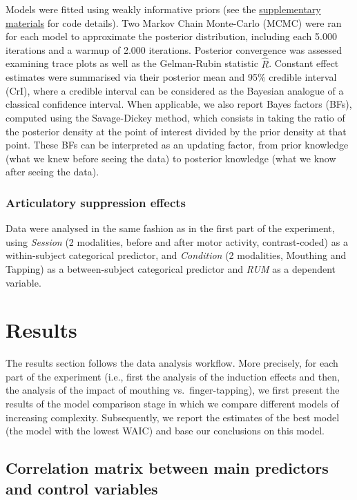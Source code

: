 \documentclass[a4paper,12pt,twoside,openright,oldfontcommands,final]{memoir}
\begin{document}
Models were fitted using weakly informative priors (see the \protect\hyperlink{suppCh6}{supplementary materials} for code details). Two Markov Chain Monte-Carlo (MCMC) were ran for each model to approximate the posterior distribution, including each 5.000 iterations and a warmup of 2.000 iterations. Posterior convergence was assessed examining trace plots as well as the Gelman-Rubin statistic \(\hat{R}\). Constant effect estimates were summarised via their posterior mean and 95\% credible interval (CrI), where a credible interval can be considered as the Bayesian analogue of a classical confidence interval. When applicable, we also report Bayes factors (BFs), computed using the Savage-Dickey method, which consists in taking the ratio of the posterior density at the point of interest divided by the prior density at that point. These BFs can be interpreted as an updating factor, from prior knowledge (what we knew before seeing the data) to posterior knowledge (what we know after seeing the data).

\hypertarget{articulatory-suppression-effects}{%
\subsubsection{Articulatory suppression effects}\label{articulatory-suppression-effects}}

Data were analysed in the same fashion as in the first part of the experiment, using \emph{Session} (2 modalities, before and after motor activity, contrast-coded) as a within-subject categorical predictor, and \emph{Condition} (2 modalities, Mouthing and Tapping) as a between-subject categorical predictor and \emph{RUM} as a dependent variable.

\hypertarget{results-3}{%
\section{Results}\label{results-3}}

The results section follows the data analysis workflow. More precisely, for each part of the experiment (i.e., first the analysis of the induction effects and then, the analysis of the impact of mouthing vs.~finger-tapping), we first present the results of the model comparison stage in which we compare different models of increasing complexity. Subsequently, we report the estimates of the best model (the model with the lowest WAIC) and base our conclusions on this model.

\hypertarget{correlation-matrix-between-main-predictors-and-control-variables}{%
\subsection{Correlation matrix between main predictors and control variables}\label{correlation-matrix-between-main-predictors-and-control-variables}}
\end{document}
